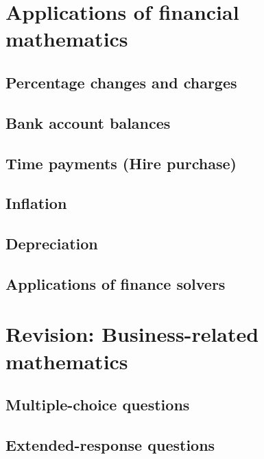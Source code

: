 \documentclass[a4paper,11pt]{article}
\begin{document}
\section{Applications of financial mathematics}
\begin{outline}

\0
\subsection{Percentage changes and charges}

\0
\subsection{Bank account balances}

\0
\subsection{Time payments (Hire purchase)}

\0
\subsection{Inflation}

\0
\subsection{Depreciation}

\0
\subsection{Applications of finance solvers}

\end{outline}

\newpage

\section{Revision: Business-related mathematics}
\begin{outline}

\0
\subsection{Multiple-choice questions}

\0
\subsection{Extended-response questions}

\end{outline}
\end{document}
